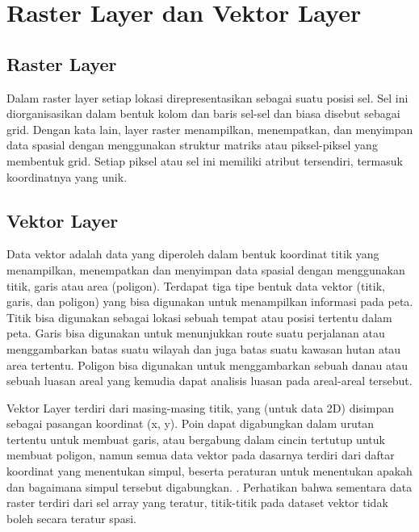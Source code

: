 \section{Raster Layer dan Vektor Layer}

\subsection{Raster Layer}
Dalam raster layer  setiap lokasi direpresentasikan sebagai suatu posisi sel. 
Sel ini diorganisasikan dalam bentuk kolom dan baris sel-sel dan biasa disebut sebagai grid. 
Dengan kata lain,  layer raster menampilkan, menempatkan, 
dan menyimpan data spasial dengan menggunakan struktur matriks atau piksel-piksel yang membentuk grid. 
Setiap piksel atau sel ini memiliki atribut tersendiri, termasuk koordinatnya yang unik.


\subsection{Vektor Layer}
Data vektor adalah data yang diperoleh dalam bentuk koordinat titik yang menampilkan, menempatkan dan menyimpan data spasial dengan menggunakan titik, garis atau area (poligon). Terdapat tiga tipe bentuk data vektor (titik, garis, dan poligon) yang bisa digunakan untuk menampilkan informasi pada peta. Titik bisa digunakan sebagai lokasi sebuah tempat atau posisi tertentu dalam peta. Garis bisa digunakan untuk menunjukkan route suatu perjalanan atau menggambarkan batas suatu wilayah dan juga batas suatu kawasan hutan atau area tertentu. Poligon bisa digunakan untuk menggambarkan sebuah danau atau sebuah luasan areal yang kemudia dapat analisis luasan pada areal-areal tersebut.

Vektor Layer terdiri dari masing-masing titik, yang (untuk data 2D) disimpan sebagai pasangan koordinat (x, y). 
Poin dapat digabungkan dalam urutan tertentu untuk membuat garis, atau bergabung dalam cincin tertutup untuk 
membuat poligon, namun semua data vektor pada dasarnya terdiri dari daftar koordinat yang menentukan simpul, 
beserta peraturan untuk menentukan apakah dan bagaimana simpul tersebut digabungkan. .
Perhatikan bahwa sementara data raster terdiri dari sel array yang teratur, 
titik-titik pada dataset vektor tidak boleh secara teratur spasi.
